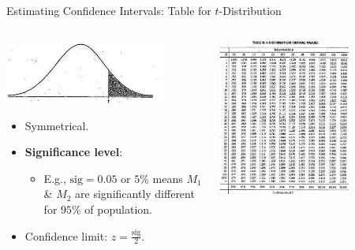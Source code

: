 \begin{frame}{Estimating Confidence Intervals: Table for $t$-Distribution}
  \begin{columns}
    \begin{column}{0.5\textwidth}
      \vspace{-6cm}
      \centering
      \includegraphics[width=0.8\textwidth]{img/ttest1.jpeg}
      \begin{itemize}
      \item Symmetrical.
      \item \textbf{\color{airforceblue}Significance level}:
        \begin{itemize}
        \item E.g., $\text{sig} = 0.05$ or $5\%$ means $M_1$ \& $M_2$ are significantly different for $95\%$ of population.
        \end{itemize}
      \item Confidence limit: $z = \frac{\text{sig}}{2}$.
      \end{itemize}
    \end{column}
    \begin{column}{0.5\textwidth}
      \centering
      \includegraphics[width=0.7\textwidth]{img/ttest2.jpeg}
    \end{column}
  \end{columns}
\end{frame}

